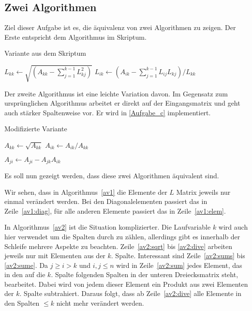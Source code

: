 \subsection{Zwei Algorithmen}
Ziel dieser Aufgabe ist es, die äquivalenz von zwei Algorithmen zu zeigen.
Der Erste entspricht dem Algorithmus im Skriptum. 
\begin{algorithm}
\caption{Variante aus dem Skriptum}
\label{av1}
\begin{algorithmic}[1]
    \STATE $L_{kk}\gets \sqrt{(A_{kk}-\sum_{j=1}^{k-1}L_{kj}^2)}$ \label{av1:diag}
        \STATE $L_{ik}\gets (A_{ik}-\sum_{j=1}^{k-1}L_{ij}L_{kj})/L_{kk}$ \label{av1:elem}
    \ENDFOR
\ENDFOR
\end{algorithmic}
\end{algorithm}
Der zweite Algorithmus ist eine leichte Variation davon. Im Gegensatz zum
ursprünglichen Algorithmus arbeitet er direkt auf der Eingangsmatrix und
geht auch stärker Spaltenweise vor. Er wird in \ref{Aufgabe_c} implementiert.
\begin{algorithm}
\caption{Modifizierte Variante}
\label{av2}
\begin{algorithmic}[1]
    \STATE $A_{kk}\gets \sqrt{A_{kk}}$ \label{av2:sqrt}
     \label{av2:divs}
        \STATE $A_{ik}\gets A_{ik}/A_{kk}$ \label{av2:div}
    \ENDFOR \label{av2:dive}

     \label{av2:sums}
            \STATE $A_{ji}\gets A_{ji}-A_{jk}A_{ik}$ \label{av2:sum}
        \ENDFOR
    \ENDFOR \label{av2:sume}
    \label{av2:suma}
\ENDFOR
\end{algorithmic}
\end{algorithm}

\newcommand{\linespanK}{Zeile~\ref{av2:sqrt} bis \ref{av2:dive} }
Es soll nun gezeigt werden, dass diese zwei Algorithmen äquivalent sind.

Wir sehen, dass in Algorithmus~\ref{av1} die Elemente der $L$ Matrix jeweils nur
einmal verändert werden. Bei den Diagonalelementen passiert das in Zeile~\ref{av1:diag},
für alle anderen Elemente passiert das in Zeile~\ref{av1:elem}. 

In Algorithmus~\ref{av2} ist die Situation komplizierter. Die Laufvariable $k$ wird auch 
hier verwendet um die Spalten durch zu zählen, allerdings gibt es innerhalb der
Schleife mehrere Aspekte zu beachten. \linespanK arbeiten
jeweils nur mit Elementen aus der $k$. Spalte. Interessant sind Zeile~\ref{av2:sums} bis
\ref{av2:sume}. Da $j\ge i>k$ und $i,j\le n$ wird in Zeile~\ref{av2:sum} jedes Element, 
das in den auf die $k$. Spalte folgenden Spalten in der unteren Dreiecksmatrix steht,
bearbeitet. Dabei wird von jedem dieser Element ein Produkt aus zwei Elementen der $k$.
Spalte subtrahiert. Daraus folgt, dass ab Zeile~\ref{av2:dive} alle Elemente in den
Spalten $\le k$ nicht mehr verändert werden.

